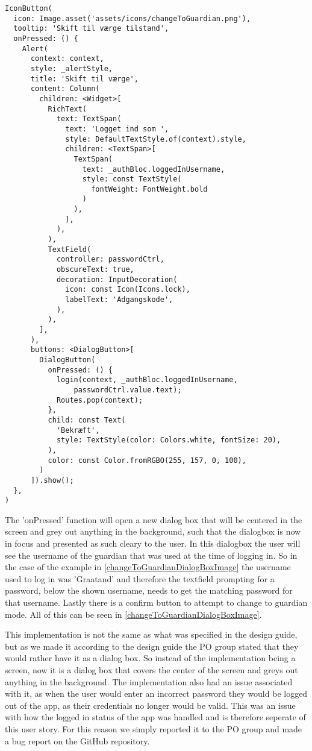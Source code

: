 \lstset{
  caption=Dialog box for confirming password,
  label=changeToGuardianDialogBox
}

\begin{lstlisting}
IconButton(
  icon: Image.asset('assets/icons/changeToGuardian.png'),
  tooltip: 'Skift til værge tilstand',
  onPressed: () {
    Alert(
      context: context,
      style: _alertStyle,
      title: 'Skift til værge',
      content: Column(
        children: <Widget>[
          RichText(
            text: TextSpan(
              text: 'Logget ind som ',
              style: DefaultTextStyle.of(context).style,
              children: <TextSpan>[
                TextSpan(
                  text: _authBloc.loggedInUsername,
                  style: const TextStyle(
                    fontWeight: FontWeight.bold
                  )
                ),
              ],
            ),
          ),
          TextField(
            controller: passwordCtrl,
            obscureText: true,
            decoration: InputDecoration(
              icon: const Icon(Icons.lock),
              labelText: 'Adgangskode',
            ),
          ),
        ],
      ),
      buttons: <DialogButton>[
        DialogButton(
          onPressed: () {
            login(context, _authBloc.loggedInUsername,
                passwordCtrl.value.text);
            Routes.pop(context);
          },
          child: const Text(
            'Bekræft',
            style: TextStyle(color: Colors.white, fontSize: 20),
          ),
          color: const Color.fromRGBO(255, 157, 0, 100),
        )
      ]).show();
  },
)
\end{lstlisting}

The 'onPressed' function will open a new dialog box that will be centered in the screen and grey out anything in the background, such that the dialogbox is now in focus and presented as such cleary to the user. 
In this dialogbox the user will see the username of the guardian that was used at the time of logging in. 
So in the case of the example in \autoref{changeToGuardianDialogBoxImage} the username used to log in was 'Graatand' and therefore the textfield prompting for a password, below the shown username, needs to get the matching password for that username. 
Lastly there is a confirm button to attempt to change to guardian mode.
All of this can be seen in \autoref{changeToGuardianDialogBoxImage}.


This implementation is not the same as what was specified in the design guide, but as we made it according to the design guide the PO group stated that they would rather have it as a dialog box. 
So instead of the implementation being a screen, now it is a dialog box that covers the center of the screen and greys out anything in the background.
The implementation also had an issue associated with it, as when the user would enter an incorrect password they would be logged out of the app, as their credentials no longer would be valid. 
This was an issue with how the logged in status of the app was handled and is therefore seperate of this user story. 
For this reason we simply reported it to the PO group and made a bug report on the GitHub repository.
